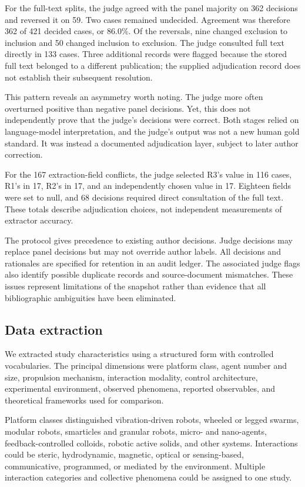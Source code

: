 For the full-text splits, the judge agreed with the
panel majority on 362 decisions and reversed it on 59.
Two cases remained undecided. Agreement was therefore
362 of 421 decided cases, or 86.0\%.
Of the reversals, nine changed exclusion to inclusion
and 50 changed inclusion to exclusion.
The judge consulted full text directly in 133 cases.
Three additional records were flagged because the
stored full text belonged to a different publication;
the supplied adjudication record does not establish
their subsequent resolution.

This pattern reveals an asymmetry worth noting.
The judge more often overturned positive than negative
panel decisions. Yet, this does not independently prove
that the judge's decisions were correct. Both stages
relied on language-model interpretation, and the
judge's output was not a new human gold standard.
It was instead a documented adjudication layer,
subject to later author correction.

For the 167 extraction-field conflicts, the judge
selected R3's value in 116 cases, R1's in 17,
R2's in 17, and an independently chosen value in 17.
Eighteen fields were set to null, and 68 decisions
required direct consultation of the full text.
These totals describe adjudication choices, not
independent measurements of extractor accuracy.

The protocol gives precedence to existing author
decisions. Judge decisions may replace panel decisions
but may not override author labels. All decisions and
rationales are specified for retention in an audit ledger.
The associated judge flags also identify possible
duplicate records and source-document mismatches.
These issues represent limitations of the snapshot
rather than evidence that all bibliographic ambiguities
have been eliminated.

\subsection{Data extraction}\label{sec:methods-extraction}

We extracted study characteristics using a structured
form with controlled vocabularies. The principal
dimensions were platform class, agent number and size,
propulsion mechanism, interaction modality, control
architecture, experimental environment, observed
phenomena, reported observables, and theoretical
frameworks used for comparison.

Platform classes distinguished vibration-driven robots,
wheeled or legged swarms, modular robots, smarticles
and granular robots, micro- and nano-agents,
feedback-controlled colloids, robotic active solids,
and other systems. Interactions could be steric,
hydrodynamic, magnetic, optical or sensing-based,
communicative, programmed, or mediated by the
environment. Multiple interaction categories and
collective phenomena could be assigned to one study.

